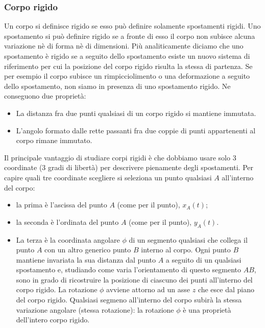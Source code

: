 \subsubsection{Corpo rigido}
Un corpo si definisce rigido se esso può definire solamente spostamenti rigidi. Uno spostamento si può definire rigido se a fronte di esso il corpo non subisce alcuna variazione nè di forma nè di dimensioni.\newline
Più analiticamente diciamo che uno spostamento è rigido se a seguito dello spostamento esiste un nuovo sistema di riferimento per cui la posizione del corpo rigido risulta la stessa di partenza.\newline
Se per esempio il corpo subisce un rimpicciolimento o una deformazione a seguito dello spostamento, non siamo in presenza di uno spostamento rigido.\newline
Ne conseguono due proprietà:
\begin{itemize}
    \item La distanza fra due punti qualsiasi di un corpo rigido si mantiene immutata.
    \item L'angolo formato dalle rette passanti fra due coppie di punti appartenenti al corpo rimane immutato.
\end{itemize}
Il principale vantaggio di studiare corpi rigidi è che dobbiamo usare solo 3 coordinate (3 gradi di libertà) per descrivere pienamente degli spostamenti.\newline
Per capire quali tre coordinate scegliere si seleziona un punto qualsiasi $A$ all'interno del corpo:
\begin{itemize}
    \item la prima è l'ascissa del punto $A$ (come per il punto), $x_A(t)$;
    \item la seconda è l'ordinata del punto $A$ (come per il punto), $y_A(t)$.
    \item La terza è la coordinata angolare $\phi$ di un segmento qualsiasi che collega il punto $A$ con un altro generico punto $B$ interno al corpo. Ogni punto $B$ mantiene invariata la sua distanza dal punto $A$ a seguito di un qualsiasi spostamento e, studiando come varia l'orientamento di questo segmento $AB$, sono in grado di ricostruire la posizione di ciascuno dei punti all'interno del corpo rigido. La rotazione $\phi$ avviene attorno ad un asse $z$ che esce dal piano del corpo rigido. Qualsiasi segmeno all'interno del corpo subirà la stessa variazione angolare (stessa rotazione): la rotazione $\phi$ è una proprietà dell'intero corpo rigido.
\end{itemize}
